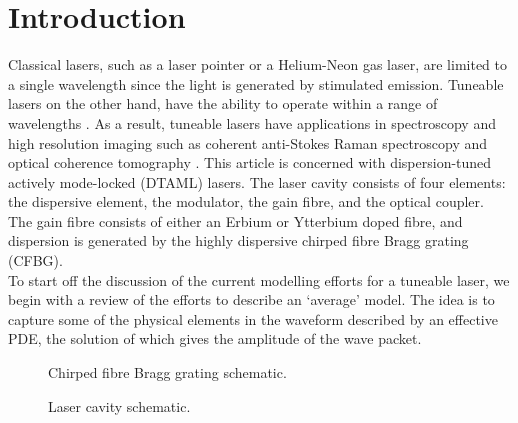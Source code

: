 \chapter{Introduction}
Classical lasers, such as a laser pointer or a Helium-Neon gas laser, are limited to a single wavelength since the light is generated by stimulated emission. Tuneable lasers on the other hand, have the ability to operate within a range of wavelengths \cite{bohun, burgoyne2010, yamashita}. As a result, tuneable lasers have applications in spectroscopy and high resolution imaging such as coherent anti-Stokes Raman spectroscopy and optical coherence tomography \cite{bohun, burgoyne2014, yamashita}. This article is concerned with dispersion-tuned actively mode-locked (DTAML) lasers. The laser cavity consists of four elements: the dispersive element, the modulator, the gain fibre, and the optical coupler. The gain fibre consists of either an Erbium or Ytterbium doped fibre, and dispersion is generated by the highly dispersive chirped fibre Bragg grating (CFBG). \\

To start off the discussion of the current modelling efforts for a tuneable laser, we begin with a review of the efforts to describe an `average' model. The idea is to capture some of the physical elements in the waveform described by an effective PDE, the solution of which gives the amplitude of the wave packet.

\begin{figure}[htbp]
\centering

\label{fig:cfbg}
\caption[Chirped Fibre Bragg Grating]{Chirped fibre Bragg grating schematic.}
\end{figure}

\begin{figure}[htbp]
\centering

\label{fig:cavity}
\caption[Laser Cavity]{Laser cavity schematic.}
\end{figure}